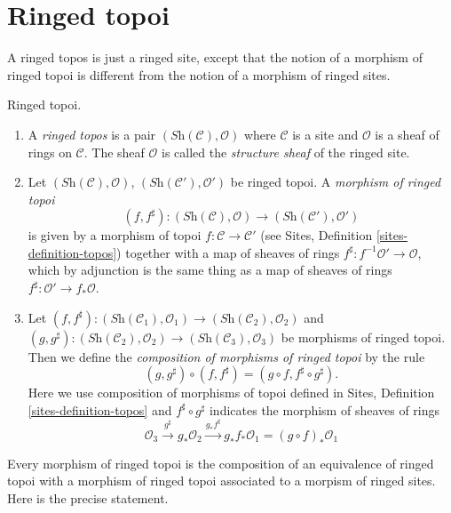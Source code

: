 \section{Ringed topoi}
\label{section-ringed-topoi}

\noindent
A ringed topos is just a ringed site, except that the notion of
a morphism of ringed topoi is different from the notion of a morphism
of ringed sites.

\begin{definition}
\label{definition-ringed-topos}
Ringed topoi.
\begin{enumerate}
\item A {\it ringed topos} is a pair
$(\textit{Sh}(\mathcal{C}), \mathcal{O})$
where $\mathcal{C}$ is a site and $\mathcal{O}$ is a sheaf of rings
on $\mathcal{C}$. The sheaf $\mathcal{O}$ is called the
{\it structure sheaf} of the ringed site.
\item Let $(\textit{Sh}(\mathcal{C}), \mathcal{O})$,
$(\textit{Sh}(\mathcal{C}'), \mathcal{O}')$ be ringed topoi.
A {\it morphism of ringed topoi}
$$
(f, f^\sharp) :
(\textit{Sh}(\mathcal{C}), \mathcal{O})
\longrightarrow
(\textit{Sh}(\mathcal{C}'), \mathcal{O}')
$$
is given by a morphism of topoi $f : \mathcal{C} \to \mathcal{C}'$
(see Sites, Definition \ref{sites-definition-topos})
together with a map of sheaves of rings
$f^\sharp : f^{-1}\mathcal{O}' \to \mathcal{O}$, which by adjunction
is the same thing as a map of sheaves of rings
$f^\sharp : \mathcal{O}' \to f_*\mathcal{O}$.
\item Let
$(f, f^\sharp) :
(\textit{Sh}(\mathcal{C}_1), \mathcal{O}_1)
\to (\textit{Sh}(\mathcal{C}_2), \mathcal{O}_2)$ and
$(g, g^\sharp) :
(\textit{Sh}(\mathcal{C}_2), \mathcal{O}_2) \to
(\textit{Sh}(\mathcal{C}_3), \mathcal{O}_3)$
be morphisms of ringed topoi. Then we define
the {\it composition of morphisms of ringed topoi}
by the rule
$$
(g, g^\sharp) \circ (f, f^\sharp) = (g \circ f, f^\sharp \circ g^\sharp).
$$
Here we use composition of morphisms of topoi defined in
Sites, Definition \ref{sites-definition-topos}
and $f^\sharp \circ g^\sharp$ indicates the morphism of sheaves of
rings
$$
\mathcal{O}_3 \xrightarrow{g^\sharp} g_*\mathcal{O}_2
\xrightarrow{g_*f^\sharp} g_*f_*\mathcal{O}_1 = (g \circ f)_*\mathcal{O}_1
$$
\end{enumerate}
\end{definition}

\noindent
Every morphism of ringed topoi is the composition of an equivalence
of ringed topoi with a morphism of ringed topoi associated to a morpism
of ringed sites. Here is the precise statement.

